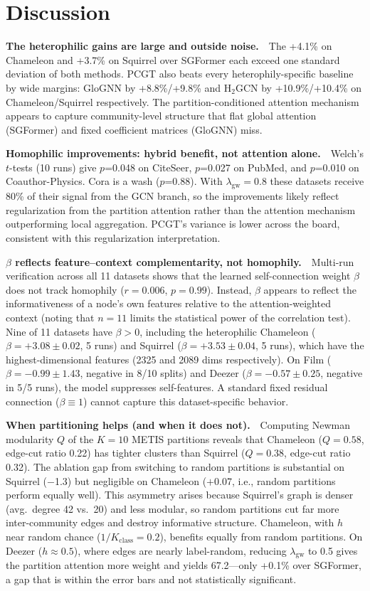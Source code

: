 \section{Discussion}

\textbf{The heterophilic gains are large and outside noise.}~~The +4.1\% on Chameleon and +3.7\% on Squirrel over SGFormer each exceed one standard deviation of both methods. PCGT also beats every heterophily-specific baseline by wide margins: GloGNN by +8.8\%/+9.8\% and H$_2$GCN by +10.9\%/+10.4\% on Chameleon/Squirrel respectively. The partition-conditioned attention mechanism appears to capture community-level structure that flat global attention (SGFormer) and fixed coefficient matrices (GloGNN) miss.

\textbf{Homophilic improvements: hybrid benefit, not attention alone.}~~Welch's $t$-tests (10 runs) give $p$=0.048 on CiteSeer, $p$=0.027 on PubMed, and $p$=0.010 on Coauthor-Physics. Cora is a wash ($p$=0.88). With $\lambda_{\text{gw}}=0.8$ these datasets receive 80\% of their signal from the GCN branch, so the improvements likely reflect regularization from the partition attention rather than the attention mechanism outperforming local aggregation. PCGT's variance is lower across the board, consistent with this regularization interpretation.

\textbf{$\beta$ reflects feature--context complementarity, not homophily.}~~Multi-run verification across all 11 datasets shows that the learned self-connection weight $\beta$ does not track homophily ($r = 0.006$, $p = 0.99$). Instead, $\beta$ appears to reflect the informativeness of a node's own features relative to the attention-weighted context (noting that $n=11$ limits the statistical power of the correlation test). Nine of 11 datasets have $\beta > 0$, including the heterophilic Chameleon ($\beta = +3.08 \pm 0.02$, 5 runs) and Squirrel ($\beta = +3.53 \pm 0.04$, 5 runs), which have the highest-dimensional features (2325 and 2089 dims respectively). On Film ($\beta = -0.99 \pm 1.43$, negative in 8/10 splits) and Deezer ($\beta = -0.57 \pm 0.25$, negative in 5/5 runs), the model suppresses self-features. A standard fixed residual connection ($\beta \equiv 1$) cannot capture this dataset-specific behavior.

\textbf{When partitioning helps (and when it does not).}~~Computing Newman modularity $Q$ of the $K\!=\!10$ METIS partitions reveals that Chameleon ($Q=0.58$, edge-cut ratio 0.22) has tighter clusters than Squirrel ($Q=0.38$, edge-cut ratio 0.32). The ablation gap from switching to random partitions is substantial on Squirrel ($-$1.3) but negligible on Chameleon ($+$0.07, i.e., random partitions perform equally well). This asymmetry arises because Squirrel's graph is denser (avg.\ degree 42 vs.\ 20) and less modular, so random partitions cut far more inter-community edges and destroy informative structure. Chameleon, with $h$ near random chance ($1/K_{\text{class}} = 0.2$), benefits equally from random partitions. On Deezer ($h \approx 0.5$), where edges are nearly label-random, reducing $\lambda_{\text{gw}}$ to 0.5 gives the partition attention more weight and yields 67.2---only +0.1\% over SGFormer, a gap that is within the error bars and not statistically significant.

